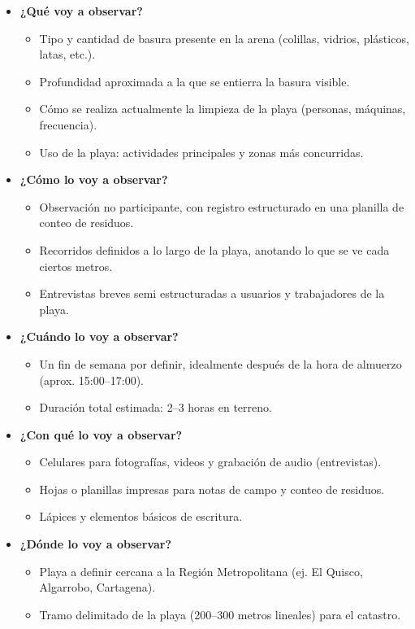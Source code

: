 \documentclass[12pt]{article}
\begin{document}
\begin{itemize}
    \item \textbf{¿Qué voy a observar?}
    \begin{itemize}
        \item Tipo y cantidad de basura presente en la arena (colillas, vidrios, plásticos, latas, etc.).
        \item Profundidad aproximada a la que se entierra la basura visible.
        \item Cómo se realiza actualmente la limpieza de la playa (personas, máquinas, frecuencia).
        \item Uso de la playa: actividades principales y zonas más concurridas.
    \end{itemize}

    \item \textbf{¿Cómo lo voy a observar?}
    \begin{itemize}
        \item Observación no participante, con registro estructurado en una planilla de conteo de residuos.
        \item Recorridos definidos a lo largo de la playa, anotando lo que se ve cada ciertos metros.
        \item Entrevistas breves semi estructuradas a usuarios y trabajadores de la playa.
    \end{itemize}

    \item \textbf{¿Cuándo lo voy a observar?}
    \begin{itemize}
        \item Un fin de semana por definir, idealmente después de la hora de almuerzo (aprox. 15:00–17:00).
        \item Duración total estimada: 2–3 horas en terreno.
    \end{itemize}

    \item \textbf{¿Con qué lo voy a observar?}
    \begin{itemize}
        \item Celulares para fotografías, videos y grabación de audio (entrevistas).
        \item Hojas o planillas impresas para notas de campo y conteo de residuos.
        \item Lápices y elementos básicos de escritura.
    \end{itemize}

    \item \textbf{¿Dónde lo voy a observar?}
    \begin{itemize}
        \item Playa a definir cercana a la Región Metropolitana (ej. El Quisco, Algarrobo, Cartagena).
        \item Tramo delimitado de la playa (200–300 metros lineales) para el catastro.
    \end{itemize}


\end{itemize}
\end{document}
